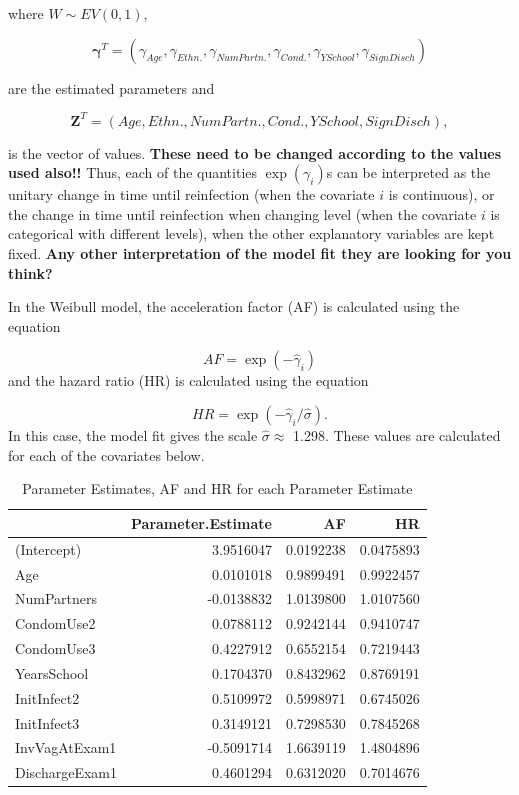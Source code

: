 \documentclass[
]{article}
\begin{document}
where \(W \sim EV(0,1)\),

\[
\mathbf{\gamma}^T = (\gamma_{Age}, \gamma_{Ethn.}, \gamma_{NumPartn.}, \gamma_{Cond.}, \gamma_{YSchool}, \gamma_{SignDisch}) 
\]

are the estimated parameters and

\[
\mathbf{Z}^T = (Age, Ethn., NumPartn., Cond., YSchool, SignDisch), 
\]

is the vector of values. \textbf{These need to be changed according to the values used also!!} Thus, each of the quantities \(\exp(\gamma_i)\)s can be interpreted as the unitary change in time until reinfection (when the covariate \(i\) is continuous), or the change in time until reinfection when changing level (when the covariate \(i\) is categorical with different levels), when the other explanatory variables are kept fixed. \textbf{Any other interpretation of the model fit they are looking for you think?}

In the Weibull model, the acceleration factor (AF) is calculated using the equation

\[
AF = \exp(-\hat{\gamma}_i)
\]
and the hazard ratio (HR) is calculated using the equation

\[
HR = \exp(-\hat{\gamma}_i/\hat{\sigma}).
\]
In this case, the model fit gives the scale \(\hat{\sigma} \approx\) 1.298. These values are calculated for each of the covariates below.

\begin{table}

\caption{\label{tab:unnamed-chunk-15}Parameter Estimates, AF and HR for each Parameter Estimate}
\centering
\begin{tabular}[t]{l|r|r|r}
\hline
  & Parameter.Estimate & AF & HR\\
\hline
(Intercept) & 3.9516047 & 0.0192238 & 0.0475893\\
\hline
Age & 0.0101018 & 0.9899491 & 0.9922457\\
\hline
NumPartners & -0.0138832 & 1.0139800 & 1.0107560\\
\hline
CondomUse2 & 0.0788112 & 0.9242144 & 0.9410747\\
\hline
CondomUse3 & 0.4227912 & 0.6552154 & 0.7219443\\
\hline
YearsSchool & 0.1704370 & 0.8432962 & 0.8769191\\
\hline
InitInfect2 & 0.5109972 & 0.5998971 & 0.6745026\\
\hline
InitInfect3 & 0.3149121 & 0.7298530 & 0.7845268\\
\hline
InvVagAtExam1 & -0.5091714 & 1.6639119 & 1.4804896\\
\hline
DischargeExam1 & 0.4601294 & 0.6312020 & 0.7014676\\
\hline
\end{tabular}
\end{table}
\end{document}
